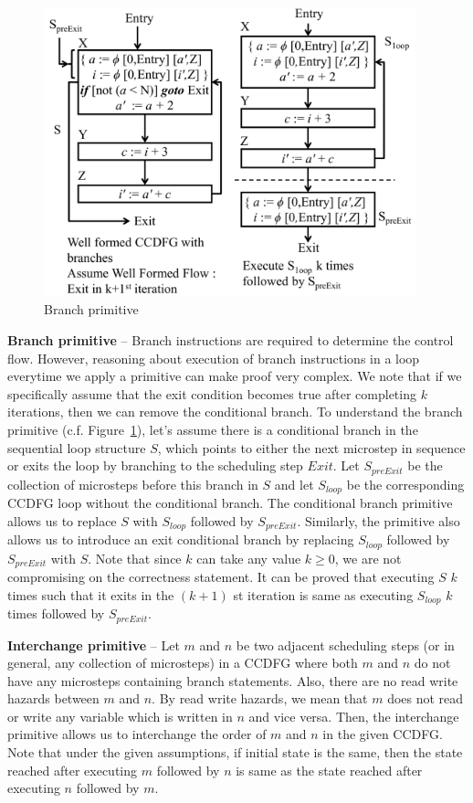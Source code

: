 \begin{figure}[H]
\begin{center}
\includegraphics[height=3.3in]{fig-proposal/conditional-branch-primitive}
\end{center}
\caption{Branch primitive}
\label{fig:branch-primitive}
\end{figure}

{\textbf {Branch primitive}} -- Branch instructions are required to determine the control flow. However, reasoning about execution of branch instructions in a loop everytime we apply a primitive can make proof very complex.
We note that if we specifically assume that the exit condition becomes true after completing $k$ iterations, then we can remove the conditional branch.
To understand the branch primitive (c.f. Figure~\ref{fig:branch-primitive}), 
let's assume there is a conditional branch in the sequential loop structure $S$, which points to either
the next microstep in sequence or exits the loop by branching to the scheduling step
$Exit$. Let $S_{preExit}$ be the collection of microsteps before this branch in $S$ and
let $S_{loop}$ be the corresponding CCDFG loop without the conditional branch.
The conditional branch primitive allows us to replace $S$ with $S_{loop}$ followed by
$S_{preExit}$. Similarly,
the primitive also allows us to introduce an exit conditional branch by replacing
$S_{loop}$ followed by $S_{preExit}$ with $S$.
Note that since $k$ can take any value $k \ge 0$, we are not compromising on the correctness statement.  
It can be proved that executing $S$ $k$ times such that it exits in the $(k+1)$ st
iteration is same as executing $S_{loop}$ $k$ times followed by $S_{preExit}$.

{\textbf {Interchange primitive}} -- Let $m$ and $n$ be two adjacent scheduling steps (or in general, any collection of microsteps) in a CCDFG where both $m$ and $n$ do not have any microsteps containing branch statements. Also, there are no read write hazards between $m$ and $n$. By read write hazards, we mean that $m$ does not read or write any variable which is written in $n$ and vice versa. Then, the interchange primitive allows us to interchange the order of $m$ and $n$ in the given CCDFG. Note that under the given assumptions, if initial state is the same, then the state reached after executing $m$ followed by $n$ is same as the state reached after executing $n$ followed by $m$.

